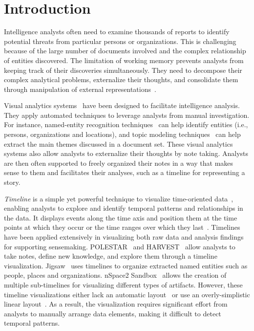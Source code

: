 \section{Introduction}
Intelligence analysts often need to examine thousands of reports to identify potential threats from particular persons or organizations. This is challenging because of the large number of documents involved and the complex relationship of entities discovered. The limitation of working memory prevents analysts from keeping track of their discoveries simultaneously. They need to decompose their complex analytical problems, externalize their thoughts, and consolidate them through manipulation of external representations~\cite{Heuer1999}.

Visual analytics systems~\cite{Pioch2006,Wright2006,Stasko2007} have been designed to facilitate intelligence analysis. They apply automated techniques to leverage analysts from manual investigation. For instance, named-entity recognition techniques~\cite{Nadeau2007} can help identify entities (i.e., persons, organizations and locations), and topic modeling techniques~\cite{Blei2003} can help extract the main themes discussed in a document set. These visual analytics systems also allow analysts to externalize their thoughts by note taking. Analysts are then often supported to freely organized their notes in a way that makes sense to them and facilitates their analyses, such as a timeline for representing a story.

\emph{Timeline} is a simple yet powerful technique to visualize time-oriented data~\cite{Tufte1983}, enabling analysts to explore and identify temporal patterns and relationships in the data. It displays events along the time axis and position them at the time points at which they occur or the time ranges over which they last~\cite{Plaisant1996}. Timelines have been applied extensively in visualizing both raw data and analysis findings for supporting sensemaking. POLESTAR~\cite{Pioch2006} and HARVEST~\cite{Gotz2006} allow analysts to take notes, define new knowledge, and explore them through a timeline visualization. Jigsaw~\cite{Gorg2013} uses timelines to organize extracted named entities such as people, places and organizations. nSpace2 Sandbox~\cite{SandboxTimeline2012} allows the creation of multiple sub-timelines for visualizing different types of artifacts. However, these timeline visualizations either lack an automatic layout~\cite{Pioch2006} or use an overly-simplistic linear layout~\cite{SandboxTimeline2012}. As a result, the visualization requires significant effort from analysts to manually arrange data elements, making it difficult to detect temporal patterns.

